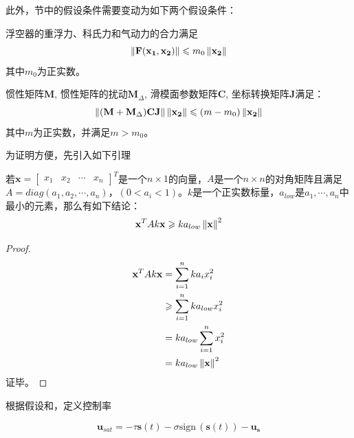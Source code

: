 此外，节中的假设条件需要变动为如下两个假设条件：

\begin{ass}\label{3ass:sat1}
浮空器的重浮力、科氏力和气动力的合力满足
\begin{equation}\label{eq:3asssat1}
    \left\lVert\mathbf{F(x_1,x_2)}\right\rVert\leqslant m_0\left\lVert\mathbf{x_2}\right\rVert
\end{equation}
其中$m_0$为正实数。
\end{ass}

\begin{ass}\label{3ass:sat2}
惯性矩阵$\mathbf{M}$, 惯性矩阵的扰动$\mathbf{M}_{\Delta}$, 滑模面参数矩阵$\mathbf{C}$, 坐标转换矩阵$\mathbf{J}$满足：
\begin{equation}\label{eq:3asssat2}
    \lVert(\mathbf{M}+\mathbf{M}_{\Delta})\mathbf{CJ}\rVert\left\lVert\mathbf{x_2}\right\rVert\leqslant (m-m_0)\left\lVert\mathbf{x_2}\right\rVert
\end{equation}
其中$m$为正实数，并满足$m>m_0$。
\end{ass}

为证明方便，先引入如下引理
\begin{lem}\label{lm:chap3}
    若$\mathbf{x}=\left[\begin{matrix}x_1&x_2&\cdots&x_n\end{matrix}\right]^T$是一个$n\times 1$的向量，$A$是一个$n\times n$的对角矩阵且满足$A=diag(a_1,a_2,\cdots,a_n)\text{，}(0<a_i<1)$。$k$是一个正实数标量，$a_{low}$是$a_1,\cdots,a_n$中最小的元素，那么有如下结论：
    \begin{equation}
        \mathbf{x}^TAk\mathbf{x}\geqslant ka_{low}\left\lVert\mathbf{\mathbf{x}}\right\rVert^2
    \end{equation}
\end{lem}

\begin{proof}
    \begin{align}
    \mathbf{x}^TAk\mathbf{x} &= \sum_{i=1}^n ka_ix_i^2 \nonumber\\
    &\geqslant \sum_{i=1}^n ka_{low}x_i^2 \nonumber\\
    &= ka_{low}\sum_{i=1}^n x_i^2 \nonumber\\
    &= ka_{low}\left\lVert\mathbf{\mathbf{x}}\right\rVert^2  
    \end{align}
    证毕。
\end{proof}

根据假设和，定义控制率

\begin{equation}\label{eq:inputsat}
\mathbf{u}_{sat} = -\tau\mathbf{s}(t)-\sigma \mathrm{sign}\,(\mathbf{s}(t)) - \mathbf{u_s}
\end{equation}

